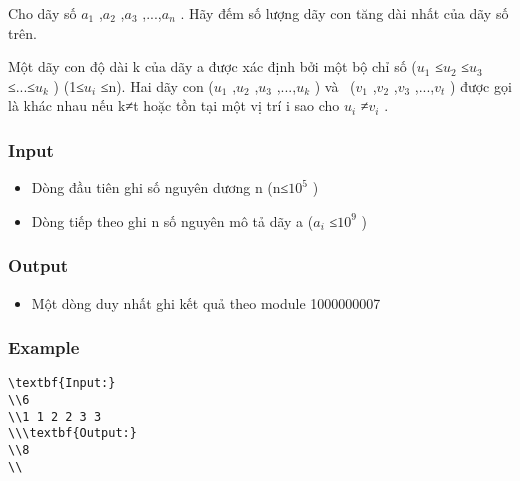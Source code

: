



   Cho dãy số $a_{1}$   ,$a_{2}$   ,$a_{3}$   ,...,$a_{n}$   .  Hãy đếm số lượng dãy con tăng dài nhất của dãy số trên.  

   Một dãy  con độ dài k của dãy a được xác định bởi một bộ chỉ số ($u_{1}$   ≤$u_{2}$   ≤$u_{3}$   ≤...≤$u_{k}$   )  (1≤$u_{i}$   ≤n). Hai dãy con ($u_{1}$   ,$u_{2}$   ,$u_{3}$   ,...,$u_{k}$   )  và  ($v_{1}$   ,$v_{2}$   ,$v_{3}$   ,...,$v_{t}$   ) được  gọi là khác nhau nếu k≠t hoặc tồn tại một vị trí i sao cho $u_{i}$   ≠$v_{i}$   .  

\subsubsection{   Input  }
\begin{itemize}
	\item     Dòng đầu tiên ghi số nguyên dương n (n≤$10^{5}$    )   
	\item     Dòng  tiếp theo ghi n số nguyên mô tả dãy a ($a_{i}$    ≤$10^{9}$    )   
\end{itemize}

\subsubsection{   Output  }
\begin{itemize}
	\item     Một dòng duy nhất ghi kết quả theo module 1000000007   
\end{itemize}

\subsubsection{   Example  }
\begin{verbatim}
\textbf{Input:}
\\6
\\1 1 2 2 3 3
\\\textbf{Output:}
\\8
\\\end{verbatim}
